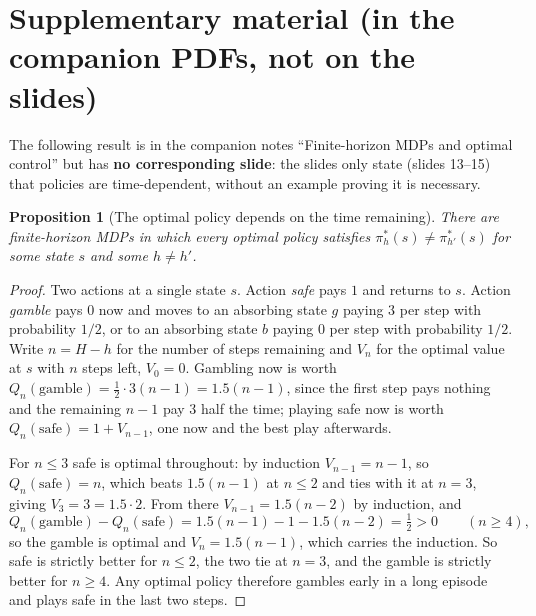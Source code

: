 \documentclass[11pt,a4paper]{article}
\theoremstyle{plain}
\newtheorem{proposition}[theorem]{Proposition}
\theoremstyle{definition}
\theoremstyle{remark}
\begin{document}
\appendix
\section{Supplementary material (in the companion PDFs, not on the slides)}\label{app:supp}

The following result is in the companion notes ``Finite-horizon MDPs and optimal control'' but has \textbf{no corresponding slide}: the slides only state (slides 13--15) that policies are time-dependent, without an example proving it is necessary.

\begin{proposition}[The optimal policy depends on the time remaining]\label{prop:timedep}
There are finite-horizon MDPs in which every optimal policy satisfies $\pi^*_h(s)\ne\pi^*_{h'}(s)$ for some state $s$ and some $h\ne h'$.
\end{proposition}
\begin{proof}
Two actions at a single state $s$. Action \emph{safe} pays $1$ and returns to $s$. Action \emph{gamble} pays $0$ now and moves to an absorbing state $g$ paying $3$ per step with probability $1/2$, or to an absorbing state $b$ paying $0$ per step with probability $1/2$. Write $n=H-h$ for the number of steps remaining and $V_n$ for the optimal value at $s$ with $n$ steps left, $V_0=0$. Gambling now is worth $Q_n(\text{gamble})=\tfrac12\cdot3(n-1)=1.5(n-1)$, since the first step pays nothing and the remaining $n-1$ pay $3$ half the time; playing safe now is worth $Q_n(\text{safe})=1+V_{n-1}$, one now and the best play afterwards.

For $n\le3$ safe is optimal throughout: by induction $V_{n-1}=n-1$, so $Q_n(\text{safe})=n$, which beats $1.5(n-1)$ at $n\le2$ and ties with it at $n=3$, giving $V_3=3=1.5\cdot2$. From there $V_{n-1}=1.5(n-2)$ by induction, and
\[
Q_n(\text{gamble})-Q_n(\text{safe})=1.5(n-1)-1-1.5(n-2)=\tfrac12>0\qquad(n\ge4),
\]
so the gamble is optimal and $V_n=1.5(n-1)$, which carries the induction. So safe is strictly better for $n\le2$, the two tie at $n=3$, and the gamble is strictly better for $n\ge4$. Any optimal policy therefore gambles early in a long episode and plays safe in the last two steps.
\end{proof}
\end{document}
